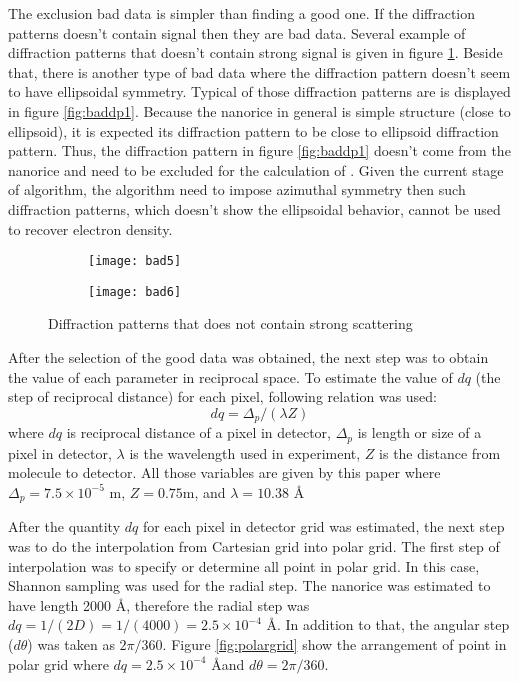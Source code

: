 The exclusion bad data is simpler than finding a good one. If the diffraction patterns doesn't contain signal then they are bad data. Several example of diffraction patterns that doesn't contain strong signal is given in figure \ref{fig:baddp2}. Beside that, there is another type of bad data where the diffraction pattern doesn't seem to have ellipsoidal symmetry. Typical of those diffraction patterns are is displayed in figure \ref{fig:baddp1}. Because the nanorice in general is simple structure (close to ellipsoid), it is expected its diffraction pattern to be close to ellipsoid diffraction pattern. Thus, the diffraction pattern in figure \ref{fig:baddp1} doesn't come from the nanorice and need to be excluded for the calculation of \Blq. Given the current stage of algorithm, the algorithm need to impose azimuthal symmetry then such diffraction patterns, which doesn't show the ellipsoidal behavior, cannot be used to recover electron density. 
\begin{figure}[h]
\begin{subfigure}{.5\textwidth}
  \centering
  \texttt{[image: bad5]}
\end{subfigure}
\begin{subfigure}{.5\textwidth}
  \centering
  \texttt{[image: bad6]}
\end{subfigure}
\caption{Diffraction patterns that does not contain strong scattering}
\label{fig:baddp2}
\end{figure}

After the selection of the good data was obtained, the next step was to obtain the value of each parameter in reciprocal space. To estimate the value of $dq$ (the step of reciprocal distance) for each pixel, following relation was used:
\begin{equation}
dq=\Delta_p/(\lambda Z)
\end{equation}
where $dq$ is reciprocal distance of a pixel in detector, 
$\Delta_p$ is length or size of a pixel in detector,
$\lambda$ is the wavelength used in experiment,
$Z$ is the distance from molecule to detector.
All those variables are given by this paper \cite{nanokassemeyer} where $\Delta_p=7.5\times 10^{-5}$ m, $Z=0.75$m, and $\lambda=10.38 $ \AA

After the quantity $dq$ for each pixel in detector grid was estimated, the next step was to do the interpolation from Cartesian grid into polar grid. The first step of interpolation was to specify or determine all point in polar grid. In this case, Shannon sampling was used for the radial step. The nanorice was estimated to have length 2000 \AA, therefore the radial step was $dq=1/(2D)=1/(4000) =2.5 \times 10^{-4}$ \AA. In addition to that, the angular step ($d\theta$) was taken as $2 \pi/360$. Figure \ref{fig:polargrid} show the arrangement of point in polar grid where $dq=2.5 \times 10^{-4} $  \AA and $d\theta=2 \pi/360$. 

